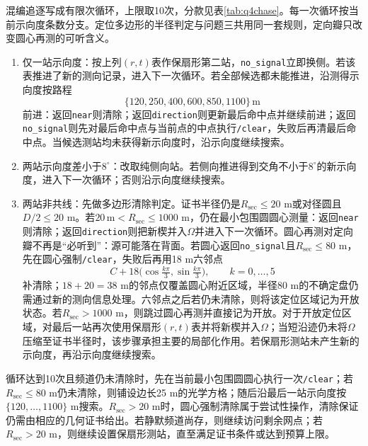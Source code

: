 \documentclass{cumcmthesis}
\begin{document}
混编追逐写成有限次循环，上限取10次，分款见表\ref{tab:q4chase}。每一次循环按当前示向度条数分支。定位多边形的半径判定与问题三共用同一套规则，定向瓣只改变圆心再测的可听含义。

\begin{enumerate}
\item 仅一站示向度：按上列$(r,t)$表作保扇形第二站，\texttt{no\_signal}立即换侧。若该表推进了新的测向记录，进入下一次循环。若全部候选都未能推进，沿测得示向度按路程
\[
\{120,250,400,600,850,1100\}\,\mathrm{m}
\]
前进：返回\texttt{near}则清除；返回\texttt{direction}则更新最后命中点并继续前进；返回\texttt{no\_signal}则先对最后命中点与当前点的中点执行\texttt{/clear}，失败后再清最后命中点。当候选测站均未获得新示向度时，沿示向度继续搜索。
\item 两站示向度差小于$8^\circ$：改取纯侧向站。若侧向推进得到交角不小于$8^\circ$的新示向度，进入下一次循环；否则沿示向度继续搜索。
\item 两站非共线：先做多边形清除判定。证书半径仍是$R_{\mathrm{sec}}\le 20$ m或对径圆且$D/2\le 20$ m。若$20\,\mathrm{m}<R_{\mathrm{sec}}\le 1000$ m，仍在最小包围圆圆心测量：返回\texttt{near}则清除；返回\texttt{direction}则把新楔并入$\Omega$并进入下一次循环。圆心再测对定向瓣不再是“必听到”：源可能落在背面。若圆心返回\texttt{no\_signal}且$R_{\mathrm{sec}}\le 80$ m，先在圆心强制\texttt{/clear}，失败后再用18 m六邻点
\[
C+18\bigl(\cos\tfrac{k\pi}{3},\sin\tfrac{k\pi}{3}\bigr),\qquad k=0,\ldots,5
\]
补清除；$18+20=38$ m的邻点仅覆盖圆心附近区域，半径80 m的不确定盘仍需通过新的测向信息处理。六邻点之后若仍未清除，则将该定位区域记为开放状态。若$R_{\mathrm{sec}}>1000$ m，则跳过圆心再测并直接记为开放。对于开放定位区域，对最后一站再次使用保扇形$(r,t)$表并将新楔并入$\Omega$；当短沿迹仍未将$\Omega$压缩至证书半径时，该步骤承担主要的局部化作用。若保扇形测站未产生新的示向度，再沿示向度继续搜索。
\end{enumerate}

循环达到10次且频道仍未清除时，先在当前最小包围圆圆心执行一次\texttt{/clear}；若$R_{\mathrm{sec}}\le 80$ m仍未清除，则铺设边长25 m的光学方格；随后沿最后一站示向度按$\{120,\ldots,1100\}$ m搜索。$R_{\mathrm{sec}}>20$ m时，圆心强制清除属于尝试性操作，清除保证仍需由相应的几何证书给出。若静默频道尚存，则继续访问剩余网点；若$R_{\mathrm{sec}}>20$ m，则继续设置保扇形测站，直至满足证书条件或达到预算上限。
\end{document}
